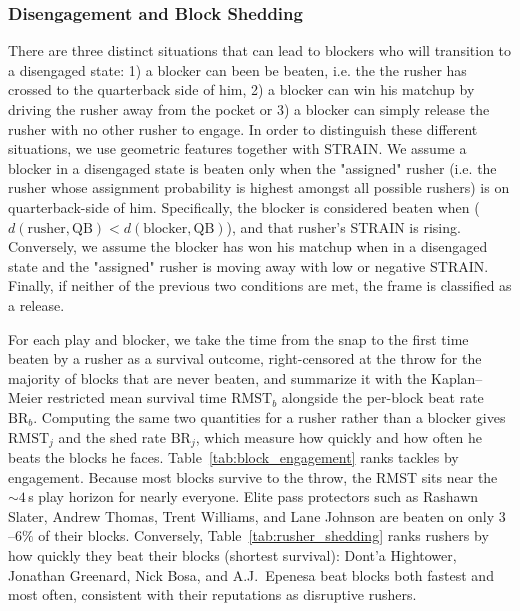 \documentclass[USenglish]{article}
\theoremstyle{dgthm}
\theoremstyle{dgdef}
\begin{document}





\subsubsection{Disengagement and Block Shedding} \label{shedding}
There are three distinct situations that can lead to blockers who will transition to a disengaged state: 1) a blocker can been be beaten, i.e. the the rusher has crossed to the quarterback side of him, 2) a blocker can win his matchup by driving the rusher away from the pocket or 3) a blocker can simply release the rusher with no other rusher to engage. In order to distinguish these different situations, we use geometric features together with STRAIN. We assume a blocker in a disengaged state is beaten only when the "assigned" rusher (i.e. the rusher whose assignment probability is highest amongst all possible rushers) is on quarterback-side of him.  Specifically, the blocker is considered beaten when  ($d(\text{rusher},\text{QB}) < d(\text{blocker},\text{QB})$), and that rusher's STRAIN is rising. Conversely, we assume the blocker has won his matchup when in a disengaged state and the "assigned" rusher is moving away with low or negative STRAIN. Finally, if neither of the previous two conditions are met, the frame is classified as a release.

For each play and blocker, we take the time from the snap to the first time beaten by a rusher as a survival outcome, right-censored at the throw for the majority of blocks that are never beaten, and summarize it with the Kaplan--Meier restricted mean survival time $\mathrm{RMST}_b$ alongside the per-block beat rate $\mathrm{BR}_b$. Computing the same two quantities for a rusher rather than a blocker gives $\mathrm{RMST}_j$ and the shed rate $\mathrm{BR}_j$, which measure how quickly and how often he beats the blocks he faces. Table~\ref{tab:block_engagement} ranks tackles by engagement. Because most blocks survive to the throw, the RMST sits near the $\sim\!4$\,s play horizon for nearly everyone. Elite pass protectors such as Rashawn Slater, Andrew Thomas, Trent Williams, and Lane Johnson are beaten on only $3$--$6\%$ of their blocks. Conversely, Table~\ref{tab:rusher_shedding} ranks rushers by how quickly they beat their blocks (shortest survival): Dont'a Hightower, Jonathan Greenard, Nick Bosa, and A.J.\ Epenesa beat blocks both fastest and most often, consistent with their reputations as disruptive rushers.
\end{document}

